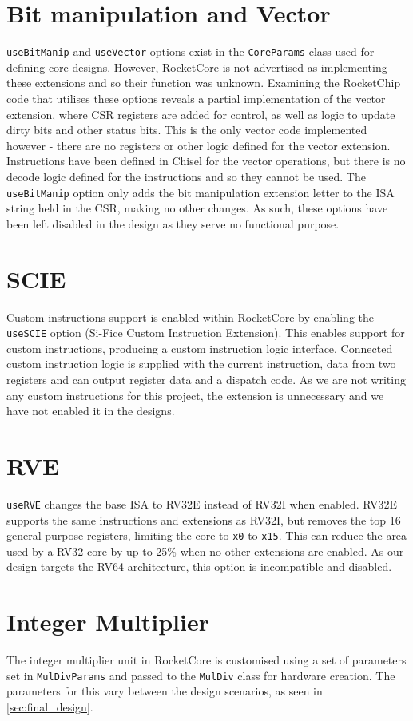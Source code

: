 \section{Bit manipulation and Vector}
\texttt{useBitManip} and \texttt{useVector} options exist in the \texttt{CoreParams} class used for defining core designs. However, RocketCore is not advertised as implementing these extensions and so their function was unknown. Examining the RocketChip code that utilises these options reveals a partial implementation of the vector extension, where CSR registers are added for control, as well as logic to update dirty bits and other status bits. This is the only vector code implemented however - there are no registers or other logic defined for the vector extension. Instructions have been defined in Chisel for the vector operations, but there is no decode logic defined for the instructions and so they cannot be used. The \texttt{useBitManip} option only adds the bit manipulation extension letter to the ISA string held in the CSR, making no other changes. As such, these options have been left disabled in the design as they serve no functional purpose.

\section{SCIE}
Custom instructions support is enabled within RocketCore by enabling the \texttt{useSCIE} option (Si-Fice Custom Instruction Extension). This enables support for custom instructions, producing a custom instruction logic interface. Connected custom instruction logic is supplied with the current instruction, data from two registers and can output register data and a dispatch code. As we are not writing any custom instructions for this project, the extension is unnecessary and we have not enabled it in the designs.

\section{RVE}
\texttt{useRVE} changes the base ISA to RV32E instead of RV32I when enabled. RV32E supports the same instructions and extensions as RV32I, but removes the top 16 general purpose registers, limiting the core to \texttt{x0} to \texttt{x15}. This can reduce the area used by a RV32 core by up to 25\% when no other extensions are enabled. As our design targets the RV64 architecture, this option is incompatible and disabled.

\section{Integer Multiplier}
The integer multiplier unit in RocketCore is customised using a set of parameters set in \texttt{MulDivParams} and passed to the \texttt{MulDiv} class for hardware creation. The parameters for this vary between the design scenarios, as seen in \ref{sec:final_design}.


